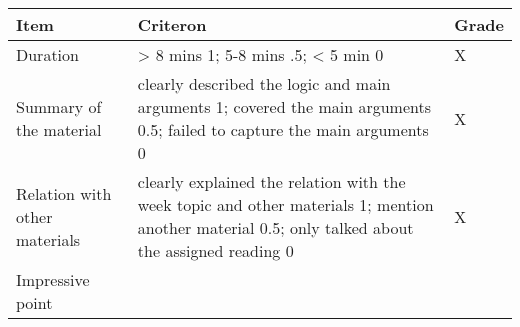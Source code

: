 \documentclass[11pt,]{article}
\theoremstyle{definition}
\theoremstyle{definition}
\theoremstyle{remark}
\begin{document}
\begin{longtable}[]{@{}lll@{}}
\toprule
\begin{minipage}[b]{0.16\columnwidth}\raggedright\strut
Item\strut
\end{minipage} & \begin{minipage}[b]{0.72\columnwidth}\raggedright\strut
Criteron\strut
\end{minipage} & \begin{minipage}[b]{0.04\columnwidth}\raggedright\strut
Grade\strut
\end{minipage}\tabularnewline
\midrule
\endhead
\begin{minipage}[t]{0.16\columnwidth}\raggedright\strut
Duration\strut
\end{minipage} & \begin{minipage}[t]{0.72\columnwidth}\raggedright\strut
\textgreater{} 8 mins 1; 5-8 mins .5; \textless{} 5 min 0\strut
\end{minipage} & \begin{minipage}[t]{0.04\columnwidth}\raggedright\strut
X\strut
\end{minipage}\tabularnewline
\begin{minipage}[t]{0.16\columnwidth}\raggedright\strut
Summary of the material\strut
\end{minipage} & \begin{minipage}[t]{0.72\columnwidth}\raggedright\strut
clearly described the logic and main arguments 1; covered the main
arguments 0.5; failed to capture the main arguments 0\strut
\end{minipage} & \begin{minipage}[t]{0.04\columnwidth}\raggedright\strut
X\strut
\end{minipage}\tabularnewline
\begin{minipage}[t]{0.16\columnwidth}\raggedright\strut
Relation with other materials\strut
\end{minipage} & \begin{minipage}[t]{0.72\columnwidth}\raggedright\strut
clearly explained the relation with the week topic and other materials
1; mention another material 0.5; only talked about the assigned reading
0\strut
\end{minipage} & \begin{minipage}[t]{0.04\columnwidth}\raggedright\strut
X\strut
\end{minipage}\tabularnewline
\begin{minipage}[t]{0.16\columnwidth}\raggedright\strut
Impressive point\strut
\end{minipage} & \begin{minipage}[t]{0.72\columnwidth}\raggedright\strut

\end{minipage}
\end{longtable}
\end{document}
